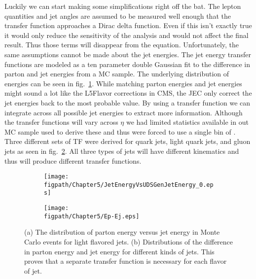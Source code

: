 Luckily we can start making some simplifications right off the bat.
The lepton quantities and jet angles are assumed to be measured well enough that the transfer function approaches a Dirac delta function.
Even if this isn't exactly true it would only reduce the sensitivity of the analysis and would not affect the final result.
Thus those terms will disappear from the equation.
Unfortunately, the same assumptions cannot be made about the jet energies.
The jet energy transfer functions are modeled as a ten parameter double Gaussian fit to the difference in parton and jet energies from a MC sample.
The underlying distribution of energies can be seen in fig.~\ref{fig:JetEnergyVsUDSGenJetEnergy}.
While matching parton energies and jet energies might sound a lot like the L5Flavor corrections in CMS, the JEC only correct the jet energies back to the most probable value.
By using a transfer function we can integrate across all possible jet energies to extract more information.
Although the transfer functions will vary across $\eta$ we had limited statistics available in out MC sample used to derive these and thus were forced to use a single bin of .
Three different sets of TF were derived for \cPqb quark jets, light quark jets, and gluon jets as seen in fig.~\ref{fig:Ep-Ej}.
All three types of jets will have different kinematics and thus will produce different transfer functions.

\begin{figure}[!hbt]
    \centering
    \begin{subfigure}[t]{0.48\textwidth}
        \texttt{[image: \\figpath/Chapter5/JetEnergyVsUDSGenJetEnergy\_0.eps]}
        \caption{}
        \label{fig:JetEnergyVsUDSGenJetEnergy}
    \end{subfigure}
    \begin{subfigure}[t]{0.48\textwidth}
        \texttt{[image: \\figpath/Chapter5/Ep-Ej.eps]}
        \caption{}
        \label{fig:Ep-Ej}
    \end{subfigure}
    \caption{(a) The distribution of parton energy versus jet energy in Monte Carlo events for light flavored jets. (b) Distributions of the difference in parton energy and jet energy for different kinds of jets. This proves that a separate transfer function is necessary for each flavor of jet.}
    \label{fig:transfer_functions}
\end{figure}


